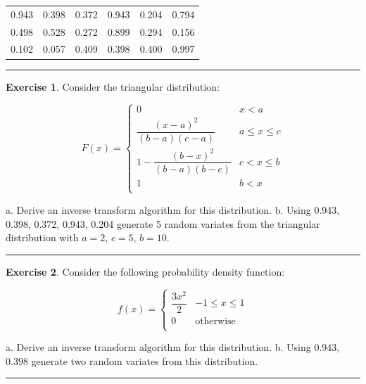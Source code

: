 \documentclass[
]{book}
\theoremstyle{definition}
\theoremstyle{definition}
\theoremstyle{definition}
\newtheorem{exercise}{Exercise}[chapter]
\theoremstyle{definition}
\theoremstyle{remark}
\begin{document}
\begin{longtable}[]{@{}cccccc@{}}
\toprule
\endhead
0.943 & 0.398 & 0.372 & 0.943 & 0.204 & 0.794 \\
0.498 & 0.528 & 0.272 & 0.899 & 0.294 & 0.156 \\
0.102 & 0.057 & 0.409 & 0.398 & 0.400 & 0.997 \\
\bottomrule
\end{longtable}

\begin{center}\rule{0.5\linewidth}{0.5pt}\end{center}

\begin{exercise}
\protect\hypertarget{exr:AppRNRVP17}{}{\label{exr:AppRNRVP17} }Consider the triangular distribution:

\[F(x) = 
  \begin{cases}
     0 & x < a\\
     \dfrac{(x - a)^2}{(b - a)(c - a)} &  a \leq x \leq c\\ 
     1 - \dfrac{(b - x)^2}{(b - a)(b - c)} & c < x \leq b\\
     1 & b < x\\
  \end{cases}\]
\end{exercise}
a. Derive an inverse transform algorithm for this distribution.
b. Using 0.943, 0.398, 0.372, 0.943, 0.204 generate 5 random variates from the triangular
distribution with \(a = 2\), \(c = 5\), \(b = 10\).

\begin{center}\rule{0.5\linewidth}{0.5pt}\end{center}

\begin{exercise}
\protect\hypertarget{exr:AppRNRVP18}{}{\label{exr:AppRNRVP18} }Consider the following probability density function:

\[f(x) = 
  \begin{cases}
     \dfrac{3x^2}{2} & -1 \leq x \leq 1\\
     0 & \text{otherwise} \\
  \end{cases}\]
\end{exercise}
a. Derive an inverse transform algorithm for this distribution.
b. Using 0.943, 0.398 generate two random variates from this distribution.

\begin{center}\rule{0.5\linewidth}{0.5pt}\end{center}
\end{document}
